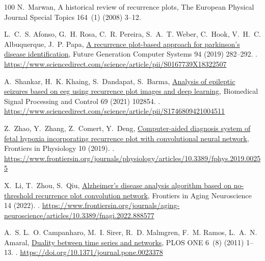 \documentclass[final,3p,times,twocolumn]{elsarticle}
\begin{document}
\begin{thebibliography}{100}
N.~Marwan, A historical review of recurrence plots, The European Physical
  Journal Special Topics 164~(1) (2008) 3--12.

L.~C.~S. Afonso, G.~H. Rosa, C.~R. Pereira, S.~A.~T. Weber, C.~Hook, V.~H.~C.
  Albuquerque, J.~P. Papa,
  \href{https://www.sciencedirect.com/science/article/pii/S0167739X18322507}{A
  recurrence plot-based approach for parkinson’s disease identification},
  Future Generation Computer Systems 94 (2019) 282--292.
\newblock \href {https://doi.org/https://doi.org/10.1016/j.future.2018.11.054}
  {}.
\newline\urlprefix\url{https://www.sciencedirect.com/science/article/pii/S0167739X18322507}

A.~Shankar, H.~K. Khaing, S.~Dandapat, S.~Barma,
  \href{https://www.sciencedirect.com/science/article/pii/S1746809421004511}{Analysis
  of epileptic seizures based on eeg using recurrence plot images and deep
  learning}, Biomedical Signal Processing and Control 69 (2021) 102854.
\newblock \href {https://doi.org/https://doi.org/10.1016/j.bspc.2021.102854}
  {}.
\newline\urlprefix\url{https://www.sciencedirect.com/science/article/pii/S1746809421004511}

Z.~Zhao, Y.~Zhang, Z.~Comert, Y.~Deng,
  \href{https://www.frontiersin.org/journals/physiology/articles/10.3389/fphys.2019.00255}{Computer-aided
  diagnosis system of fetal hypoxia incorporating recurrence plot with
  convolutional neural network}, Frontiers in Physiology 10 (2019).
\newblock \href {https://doi.org/10.3389/fphys.2019.00255}
  {}.
\newline\urlprefix\url{https://www.frontiersin.org/journals/physiology/articles/10.3389/fphys.2019.00255}

X.~Li, T.~Zhou, S.~Qiu,
  \href{https://www.frontiersin.org/journals/aging-neuroscience/articles/10.3389/fnagi.2022.888577}{Alzheimer's
  disease analysis algorithm based on no-threshold recurrence plot convolution
  network}, Frontiers in Aging Neuroscience 14 (2022).
\newblock \href {https://doi.org/10.3389/fnagi.2022.888577}
  {}.
\newline\urlprefix\url{https://www.frontiersin.org/journals/aging-neuroscience/articles/10.3389/fnagi.2022.888577}

A.~S. L.~O. Campanharo, M.~I. Sirer, R.~D. Malmgren, F.~M. Ramos, L.~A.~N.
  Amaral, \href{https://doi.org/10.1371/journal.pone.0023378}{Duality between
  time series and networks}, PLOS ONE 6~(8) (2011) 1--13.
\newblock \href {https://doi.org/10.1371/journal.pone.0023378}
  {}.
\newline\urlprefix\url{https://doi.org/10.1371/journal.pone.0023378}


\end{thebibliography}
\end{document}
